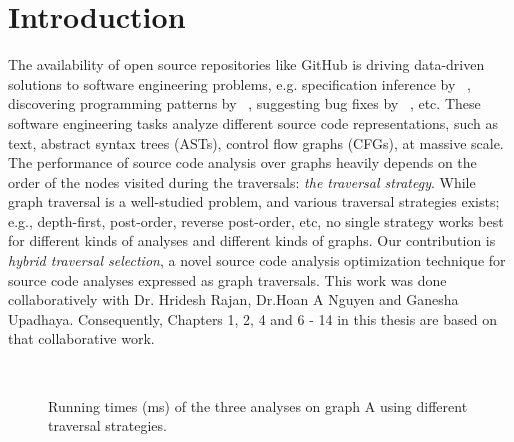 \chapter{Introduction}
\label{sec:introduction}

The availability of open source repositories like GitHub is driving
data-driven solutions to software engineering problems, e.g.
specification inference by ~\cite{nguyen2014mining}, discovering programming
patterns by ~\cite{thummalapenta2009alattin}, suggesting bug
fixes by ~\cite{livshits2005dynamine,cpminer}, etc.
These software engineering tasks analyze different source code
representations, such as text, abstract syntax trees (ASTs), control
flow graphs (CFGs), at massive scale.
The performance of source code analysis over graphs heavily depends on
the order of the nodes visited during the traversals: {\em the
traversal strategy}. While graph traversal is a well-studied problem,
and various traversal strategies exists; e.g., depth-first,
post-order, reverse post-order, etc, no single strategy works best for
different kinds of analyses and different kinds of graphs.
Our contribution is {\em hybrid traversal selection}, a
novel source code analysis optimization technique for source code
analyses expressed as graph traversals. This work was done collaboratively with Dr. Hridesh Rajan, Dr.Hoan A Nguyen and Ganesha Upadhaya. Consequently, Chapters 1, 2, 4 and 6 - 14 in this thesis are based on that collaborative work.

\begin{figure}[t]%
\centering
{}
\\
\caption{Running times (ms) of the three analyses on graph A using different traversal strategies.}
\label{fig:example-a-graph}
\end{figure}

